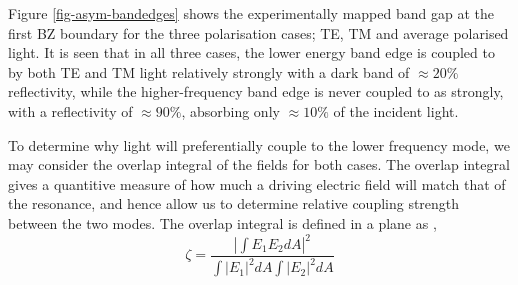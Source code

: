 Figure \ref{fig-asym-bandedges} shows the experimentally mapped band gap at the first BZ boundary for the three polarisation cases;  TE, TM and average polarised light. It is seen that in all three cases, the lower energy band edge is coupled to by both TE and TM light relatively strongly with a dark band of $\approx 20\%$ reflectivity, while the higher-frequency band edge is never coupled to as strongly, with a reflectivity of $\approx 90\%$, absorbing only $\approx 10\%$ of the incident light.  

To determine why light will preferentially couple to the lower frequency mode, we may consider the overlap integral of the fields for both cases. The overlap integral gives a quantitive measure of how much a driving electric field will match that of the resonance, and hence allow us to determine relative coupling strength between the two modes. The overlap integral is defined in a plane as \cite{Damask2004},
\begin{equation}
\zeta = \frac{|\int E_1 E_2 dA|^2}{\int |E_1|^2 dA \int |E_2|^2 dA}
\end{equation}

